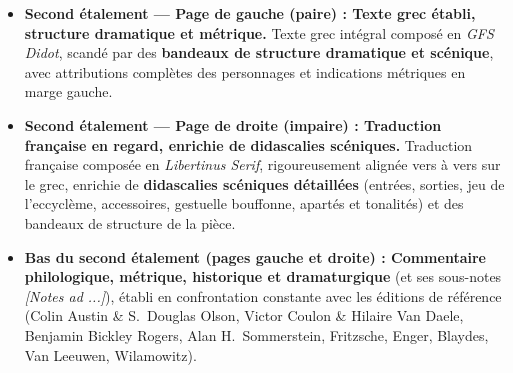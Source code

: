 \documentclass[11pt,twoside]{book}
\begin{document}
{{\begin{itemize}
      \item \textbf{Second étalement — Page de gauche (paire) : Texte grec établi, structure dramatique et métrique.} Texte grec intégral composé en \textit{GFS Didot}, scandé par des \textbf{bandeaux de structure dramatique et scénique}, avec attributions complètes des personnages et indications métriques en marge gauche.
      \item \textbf{Second étalement — Page de droite (impaire) : Traduction française en regard, enrichie de didascalies scéniques.} Traduction française composée en \textit{Libertinus Serif}, rigoureusement alignée vers à vers sur le grec, enrichie de \textbf{didascalies scéniques détaillées} (entrées, sorties, jeu de l'eccyclème, accessoires, gestuelle bouffonne, apartés et tonalités) et des bandeaux de structure de la pièce.
      \item \textbf{Bas du second étalement (pages gauche et droite) : Commentaire philologique, métrique, historique et dramaturgique} (et ses sous-notes \textit{[Notes ad ...]}), établi en confrontation constante avec les éditions de référence (Colin Austin \& S.~Douglas Olson, Victor Coulon \& Hilaire Van Daele, Benjamin Bickley Rogers, Alan H.~Sommerstein, Fritzsche, Enger, Blaydes, Van Leeuwen, Wilamowitz).
    \end{itemize}
    \vspace{2pt}
  }%
}
\end{document}
